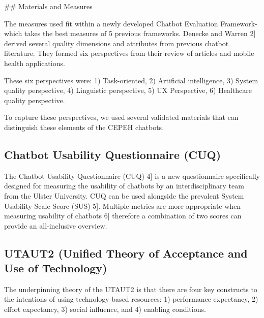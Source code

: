 \documentclass[a4paper, nobind]{templates/ociamthesis}
\begin{document}
\#\# Materials and Measures

The measures used fit within a newly developed Chatbot Evaluation Framework- which takes the best measures of 5 previous frameworks.
Denecke and Warren \hspace{0pt}{[}2{]}\hspace{0pt} derived several quality dimensions and attributes from previous chatbot literature.
They formed six perspectives from their review of articles and mobile health applications.

These six perspectives were: 1) Task-oriented, 2) Artificial intelligence, 3) System quality perspective, 4) Linguistic perspective, 5) UX Perspective, 6) Healthcare quality perspective.

To capture these perspectives, we used several validated materials that can distinguish these elements of the CEPEH chatbots.

\hypertarget{chatbot-usability-questionnaire-cuq}{%
\subsection{Chatbot Usability Questionnaire (CUQ)}\label{chatbot-usability-questionnaire-cuq}}

The Chatbot Usability Questionnaire (CUQ) \hspace{0pt}{[}4{]}\hspace{0pt} is a new questionnaire specifically designed for measuring the usability of chatbots by an interdisciplinary team from the Ulster University.
CUQ can be used alongside the prevalent System Usability Scale Score (SUS) \hspace{0pt}{[}5{]}\hspace{0pt}.
Multiple metrics are more appropriate when measuring usability of chatbots \hspace{0pt}{[}6{]}\hspace{0pt} therefore a combination of two scores can provide an all-inclusive overview.

\hypertarget{utaut2-unified-theory-of-acceptance-and-use-of-technology}{%
\subsection{UTAUT2 (Unified Theory of Acceptance and Use of Technology)}\label{utaut2-unified-theory-of-acceptance-and-use-of-technology}}

The underpinning theory of the UTAUT2 is that there are four key constructs to the intentions of using technology based resources: 1) performance expectancy, 2) effort expectancy, 3) social influence, and 4) enabling conditions.
\end{document}
